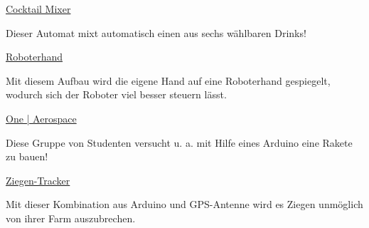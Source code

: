 \vfill
\begin{links}
	\item \href{https://www.instructables.com/id/6-Shooter-Arduino-Drink-Mixing-Station/}{Cocktail Mixer}
	
	Dieser Automat mixt automatisch einen aus sechs wählbaren Drinks!
	
	\item \href{https://blog.arduino.cc/2014/07/17/a-low-cost-robotic-hand-tutorial-mirroring-your-own-fingers/}{Roboterhand}
	
	Mit diesem Aufbau wird die eigene Hand auf eine Roboterhand gespiegelt, wodurch sich der Roboter viel besser steuern lässt.
	
	\item \href{http://oneaerospace.com/index.html}{One | Aerospace}
	
	Diese Gruppe von Studenten versucht u. a. mit Hilfe eines Arduino eine Rakete zu bauen!
	
	\item \href{https://www.heise.de/make/meldung/Elektronikbasteleien-von-der-Farm-Ziegen-mit-GPS-auf-der-Spur-4340346.html}{Ziegen-Tracker}
	
	Mit dieser Kombination aus Arduino und GPS-Antenne wird es Ziegen unmöglich von ihrer Farm auszubrechen.
\end{links}